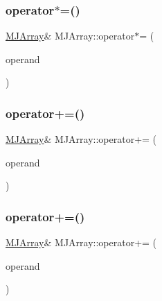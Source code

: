 \hypertarget{classMJArray_a22272f9dcbc763c98b67368f6a897aad}{}\label{classMJArray_a22272f9dcbc763c98b67368f6a897aad} 
\subsubsection{\texorpdfstring{operator$\ast$=()}{operator*=()}\hspace{0.1cm}{\footnotesize\ttfamily [2/2]}}
{\footnotesize\ttfamily \hyperlink{classMJArray}{M\+J\+Array}\& M\+J\+Array\+::operator$\ast$= (\begin{DoxyParamCaption}\item[{const double \&}]{operand }\end{DoxyParamCaption})}

\hypertarget{classMJArray_a90d77478cd3c6a90d8abb4dbbaff7f34}{}\label{classMJArray_a90d77478cd3c6a90d8abb4dbbaff7f34} 
\subsubsection{\texorpdfstring{operator+=()}{operator+=()}\hspace{0.1cm}{\footnotesize\ttfamily [1/2]}}
{\footnotesize\ttfamily \hyperlink{classMJArray}{M\+J\+Array}\& M\+J\+Array\+::operator+= (\begin{DoxyParamCaption}\item[{const \hyperlink{classMJArray}{M\+J\+Array} \&}]{operand }\end{DoxyParamCaption})}

\hypertarget{classMJArray_a63ea203f87c5e0c4ec6e63089d3c4374}{}\label{classMJArray_a63ea203f87c5e0c4ec6e63089d3c4374} 
\subsubsection{\texorpdfstring{operator+=()}{operator+=()}\hspace{0.1cm}{\footnotesize\ttfamily [2/2]}}
{\footnotesize\ttfamily \hyperlink{classMJArray}{M\+J\+Array}\& M\+J\+Array\+::operator+= (\begin{DoxyParamCaption}\item[{const double \&}]{operand }\end{DoxyParamCaption})}

